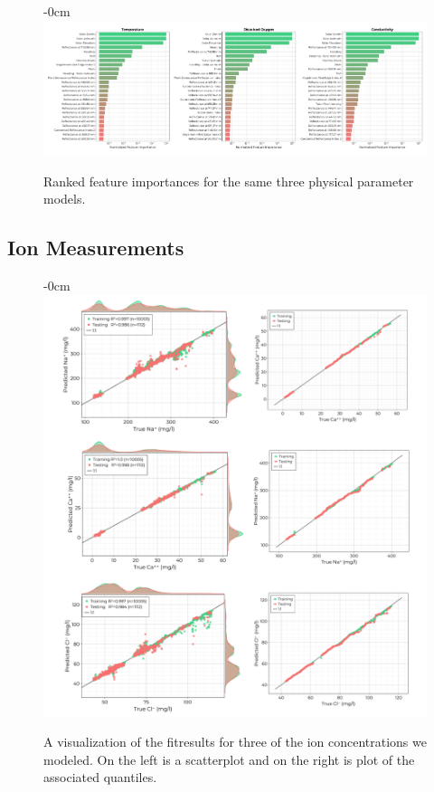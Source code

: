 \documentclass[journal,article,submit,pdftex,moreauthors]{Definitions/mdpi}
\begin{document}
\begin{figure}[H]
\begin{adjustwidth}{-\extralength}{0cm}
\centering
\includegraphics[width=18.0cm]{paper/figures/results/fits/physical-ranking.pdf}
\end{adjustwidth}
\caption{Ranked feature importances for the same three physical parameter models.\label{fig:physical-fit}}
\end{figure}  


\subsection{Ion Measurements}

\begin{figure}[H]
\begin{adjustwidth}{-\extralength}{0cm}
\centering
\includegraphics[width=16.0cm]{paper/figures/results/fits/ions-fitres.pdf}
\end{adjustwidth}
\caption{A visualization of the fitresults for three of the ion concentrations we modeled. On the left is a scatterplot and on the right is plot of the associated quantiles.\label{fig:ions-fit}}
\end{figure}  
\end{document}
